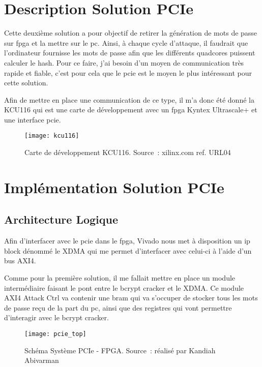 \newpage

\section{Description Solution PCIe}

Cette deuxième solution a pour objectif de retirer la génération de mots de passe sur \gls{fpga} et la mettre sur le \gls{pc}.
Ainsi, à chaque cycle d'attaque, il faudrait que l'ordinateur fournisse les mots de passe afin que les différents quadcores puissent calculer le hash.
Pour ce faire, j'ai besoin d'un moyen de communication très rapide et fiable, c'est pour cela que le \gls{pcie} est le moyen le plus intéressant pour cette solution.

Afin de mettre en place une communication de ce type, il m'a donc été donné la KCU116 qui est une carte de développement avec un \gls{fpga} Kyntex Ultrascale+ et une interface \gls{pcie}.

\begin{figure}[tbph!]
	\centering
	\texttt{[image: kcu116]}
	\caption[Carte de développement KCU116]{Carte de développement KCU116. Source : xilinx.com ref. URL04}
	\label{fig:kcu116}
\end{figure}

\section{Implémentation Solution PCIe}

\subsection{Architecture Logique}

Afin d'interfacer avec le \gls{pcie} dans le \gls{fpga}, Vivado nous met à disposition un \gls{ip} block dénommé le XDMA qui me permet d'interfacer avec celui-ci à l'aide d'un bus AXI4.

Comme pour la première solution, il me fallait mettre en place un module intermédiaire faisant le pont entre le bcrypt cracker et le XDMA.
Ce module AXI4 Attack Ctrl va contenir une \gls{bram} qui va s'occuper de stocker tous les mots de passe reçu de la part du \gls{pc}, ainsi que des registres qui vont permettre d'interagir avec le bcrypt cracker.

\begin{figure}[tbph!]
	\centering
	\texttt{[image: pcie\_top]}
	\caption[Schéma Système PCIe - FPGA]{Schéma Système PCIe - FPGA. Source : réalisé par Kandiah Abivarman}
	\label{fig:pcie_top}
\end{figure}

